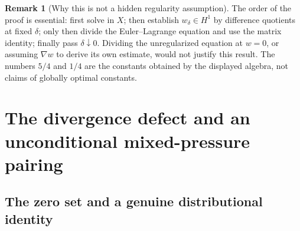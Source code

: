 \documentclass[11pt,a4paper]{article}
\theoremstyle{definition}
\newtheorem{remark}[theorem]{Remark}
\begin{document}
\begin{remark}[Why this is not a hidden regularity assumption]
The order of the proof is essential: first solve in $X$; then establish $w_\delta\in H^1$ by difference quotients at fixed $\delta$; only then divide the Euler--Lagrange equation and use the matrix identity; finally pass $\delta\downarrow0$. Dividing the unregularized equation at $w=0$, or assuming $\nabla w$ to derive its own estimate, would not justify this result. The numbers $5/4$ and $1/4$ are the constants obtained by the displayed algebra, not claims of globally optimal constants.
\end{remark}

\section{The divergence defect and an unconditional mixed-pressure pairing}\label{sec:mixed}

\subsection{The zero set and a genuine distributional identity}
\end{document}
